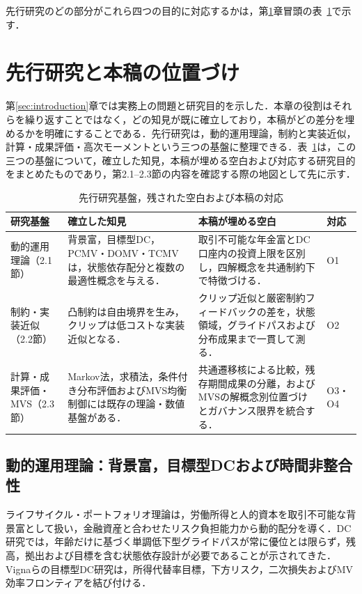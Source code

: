 \documentclass[10pt,a4paper]{article}
\theoremstyle{plain}
\theoremstyle{definition}
\begin{document}
先行研究のどの部分がこれら四つの目的に対応するかは，第\ref{sec:literature}章冒頭の表~\ref{tab:literature-positioning}で示す．

\section{先行研究と本稿の位置づけ}
\label{sec:literature}

第\ref{sec:introduction}章では実務上の問題と研究目的を示した．本章の役割はそれらを繰り返すことではなく，どの知見が既に確立しており，本稿がどの差分を埋めるかを明確にすることである．先行研究は，動的運用理論，制約と実装近似，計算・成果評価・高次モーメントという三つの基盤に整理できる．表~\ref{tab:literature-positioning}は，この三つの基盤について，確立した知見，本稿が埋める空白および対応する研究目的をまとめたものであり，第2.1--2.3節の内容を確認する際の地図として先に示す．

\begin{table}[H]
\centering\footnotesize
\caption{先行研究基盤，残された空白および本稿の対応}
\label{tab:literature-positioning}
\begin{tabularx}{\textwidth}{p{31mm}p{47mm}X p{15mm}}
\toprule
研究基盤 & 確立した知見 & 本稿が埋める空白 & 対応 \\
\midrule
動的運用理論（2.1節）
& 背景富，目標型DC，PCMV・DOMV・TCMVは，状態依存配分と複数の最適性概念を与える．
& 取引不可能な年金富とDC口座内の投資上限を区別し，四解概念を共通制約下で特徴づける．
& O1 \\
制約・実装近似（2.2節）
& 凸制約は自由境界を生み，クリップは低コストな実装近似となる．
& クリップ近似と厳密制約フィードバックの差を，状態領域，グライドパスおよび分布成果まで一貫して測る．
& O2 \\
計算・成果評価・MVS（2.3節）
& Markov法，求積法，条件付き分布評価およびMVS均衡制御には既存の理論・数値基盤がある．
& 共通遷移核による比較，残存期間成果の分離，およびMVSの解概念別位置づけとガバナンス限界を統合する．
& O3・O4 \\
\bottomrule
\end{tabularx}
\end{table}

\subsection{動的運用理論：背景富，目標型DCおよび時間非整合性}
\label{sec:dynamic-theory-literature}

ライフサイクル・ポートフォリオ理論は，労働所得と人的資本を取引不可能な背景富として扱い，金融資産と合わせたリスク負担能力から動的配分を導く\citep{Merton1969,BodieMertonSamuelson1992,Viceira2001,CoccoGomesMaenhout2005}．DC研究では，年齢だけに基づく単調低下型グライドパスが常に優位とは限らず，残高，拠出および目標を含む状態依存設計が必要であることが示されてきた\citep{CairnsBlakeDowd2006,BasuByrneDrew2011,ForsythVetzal2019,Estrada2019}．Vignaらの目標型DC研究は，所得代替率目標，下方リスク，二次損失およびMV効率フロンティアを結び付ける\citep{VignaHaberman2001,HabermanVigna2002,HojgaardVigna2007,Vigna2014,MenoncinVigna2017}．
\end{document}
